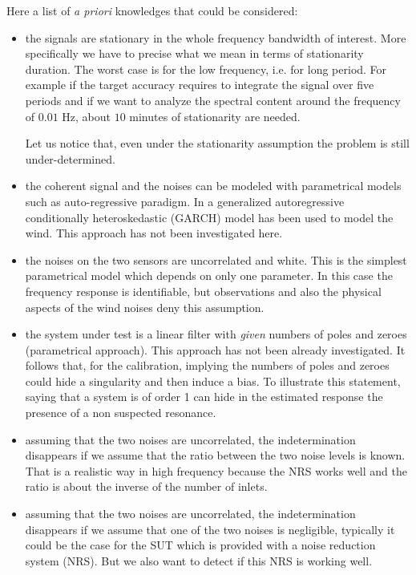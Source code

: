 Here a list of {\it a priori} knowledges that could be considered:
\begin{itemize}
\item
 the signals are stationary in the whole frequency bandwidth of interest. More specifically we have to precise what we mean in terms of stationarity duration. The worst case  is for the low frequency, i.e. for long period. For example if the target accuracy requires to integrate the signal over five periods and if we want to analyze the spectral content around the frequency of $0.01$ Hz, about $10$ minutes of stationarity are needed.
 
Let us notice that, even under the stationarity assumption the problem is still under-determined.
 

  \item
the coherent signal and the noises can be modeled with parametrical models such as auto-regressive paradigm. In \cite{frazier:2013} a generalized autoregressive conditionally heteroskedastic (GARCH) model has been used to model the wind. This approach has not been investigated here.

  \item
 the noises on the two sensors are uncorrelated and white. This is the simplest parametrical model which depends on only one parameter. In this case the frequency response is identifiable, but observations and also the physical aspects of the wind noises deny this assumption.
   \item
the system under test is a linear filter with {\it given} numbers of poles and zeroes (parametrical approach). This approach has not been already investigated. It follows that, for the calibration, implying the numbers of poles and zeroes could hide a singularity and then induce a bias. To illustrate this statement, saying that a system is of order 1 can hide in the estimated response the presence of a non suspected resonance.  

\item
assuming that the two noises are uncorrelated, the indetermination disappears if  we assume that the ratio between the two noise levels is known. That is a realistic way in high frequency because the NRS works well and the ratio is about the inverse of the number of inlets.

\item
assuming that the two noises are uncorrelated, the indetermination disappears if  we assume that one of the two noises is negligible, typically it could be the case for the SUT which is provided with a noise reduction system (NRS). But we also want to detect if this NRS is working well.


\end{itemize}
